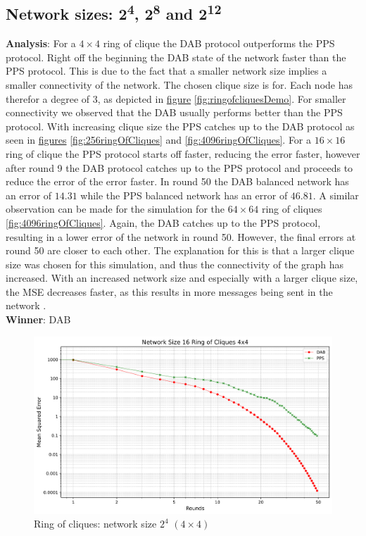 \subsection{Network sizes: 2\textsuperscript{4}, 2\textsuperscript{8} and 2\textsuperscript{12}}
\textbf{Analysis}: For a $4\times4$ ring of clique the DAB protocol outperforms the PPS protocol. Right off the beginning the DAB state of the network faster than the PPS protocol. This is due to the fact that a smaller network size implies a smaller connectivity of the network. The chosen clique size is for. Each node has therefor a degree of 3, as depicted in \hyperref[fig:ringofcliquesDemo]{figure} \ref{fig:ringofcliquesDemo}. For smaller connectivity we observed that the DAB usually performs better than the PPS protocol. With increasing clique size the PPS catches up to the DAB protocol as seen in \hyperref[fig:256ringOfCliques]{figures} \ref{fig:256ringOfCliques} and \ref{fig:4096ringOfCliques}. For a $16\times16$ ring of clique the PPS protocol starts off faster, reducing the error faster, however after round 9 the DAB protocol catches up to the PPS protocol and proceeds to reduce the error of the error faster. In round 50 the DAB balanced network has an error of $14.31$ while the PPS balanced network has an error of $46.81$. A similar observation can be made for the simulation for the $64 \times 64$ ring of cliques \ref{fig:4096ringOfCliques}. Again, the DAB catches up to the PPS protocol, resulting in a lower error of the network in round 50. However, the final errors at round 50 are closer to each other. The explanation for this is that a larger clique size was chosen for this simulation, and thus the connectivity of the graph has increased. With an increased network size and especially with a larger clique size, the MSE decreases faster, as this results in more messages being sent in the network \cite{nugroho2023PushPullSumDataAg}. \\
\textbf{Winner}: DAB \\

\begin{figure}[H]
    \centering
    \includegraphics[scale=0.5]{figures/ringOfCliquesSimulations/DAB_vs_PPS_RoC_r50_n16.png}
    \caption{Ring of cliques: network size $2^{4}$ $(4\times4)$}
    \label{fig:16ringOfCliques}
\end{figure}


